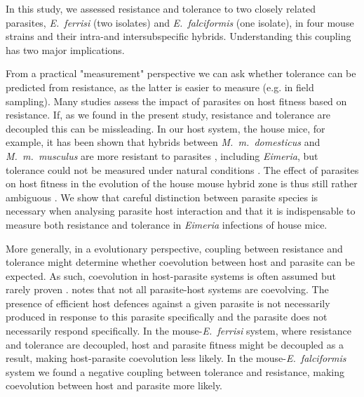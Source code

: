 \documentclass[12pt]{article}
\begin{document}
In this study, we assessed resistance and tolerance to two closely related parasites, \textit{E.~ferrisi} (two isolates) and \textit{E.~falciformis} (one isolate), in four mouse strains and their intra-and intersubspecific hybrids. Understanding this coupling has two major implications. \par

From a practical "measurement" perspective we can ask whether tolerance can be predicted from resistance, as the latter is easier to measure (e.g. in field sampling). Many studies assess the impact of parasites on host fitness based on resistance. If, as we found in the present study, resistance and tolerance are decoupled this can be missleading. In our host system, the house mice, for example, it has been shown that hybrids between \textit{M.~m.~domesticus} and \textit{M.~m.~musculus} are more resistant to parasites \citep{baird_where_2012}, including \textit{Eimeria}, but tolerance could not be measured under natural conditions \citep{Balard2020}. The effect of parasites on host fitness in the evolution of the house mouse hybrid zone is thus still rather ambiguous \citep{baird_shifting_2019}. We show that careful distinction between parasite species is necessary when analysing parasite host interaction \parencite[see also][]{jarquin-diaz_detection_2019} and that it is indispensable to measure both resistance and tolerance in \textit{Eimeria} infections of house mice. \par

More generally, in a evolutionary perspective, coupling between resistance and tolerance might determine whether coevolution between host and parasite can be expected. As such, coevolution in host-parasite systems is often assumed but rarely proven \citep{Woolhouse2002}. \cite{Janzen1980} notes that not all parasite-host systems are coevolving. The presence of efficient host defences against a given parasite is not necessarily produced in response to this parasite specifically and the parasite does not necessarily respond specifically. In the mouse-\textit{E.~ferrisi} system, where resistance and tolerance are decoupled, host and parasite fitness might be decoupled as a result, making host-parasite coevolution less likely. In the mouse-\textit{E.~falciformis} system we found a negative coupling between tolerance and resistance, making coevolution between host and parasite more likely. \par
\end{document}
